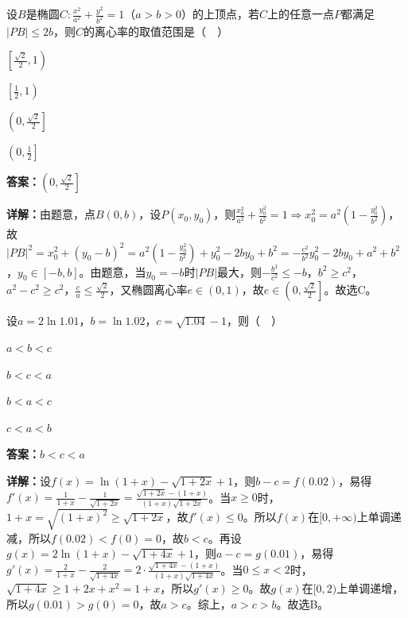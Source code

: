 \begin{question}[points=5]
设$B$是椭圆$C:\frac{x^2}{a^2}+\frac{y^2}{b^2}=1$（$a>b>0$）的上顶点，若$C$上的任意一点$P$都满足$|PB|\leq 2b$，则$C$的离心率的取值范围是（  ）
\begin{choices}
  \item $\left[\frac{\sqrt{2}}{2},1\right)$
  \item $\left[\frac12,1\right)$
  \item $\left(0,\frac{\sqrt{2}}{2}\right]$
  \item $\left(0,\frac12\right]$
\end{choices}
\begin{solution}
\textbf{答案：}$\left(0,\frac{\sqrt{2}}{2}\right]$

\textbf{详解：}由题意，点$B(0,b)$，设$P(x_0,y_0)$，则$\frac{x_0^2}{a^2}+\frac{y_0^2}{b^2}=1\Rightarrow x_0^2=a^2\left(1-\frac{y_0^2}{b^2}\right)$，故$|PB|^2=x_0^2+(y_0-b)^2=a^2\left(1-\frac{y_0^2}{b^2}\right)+y_0^2-2by_0+b^2=-\frac{c^2}{b^2}y_0^2-2by_0+a^2+b^2$，$y_0\in[-b,b]$。由题意，当$y_0=-b$时$|PB|$最大，则$-\frac{b^3}{c^2}\leq -b$，$b^2\geq c^2$，$a^2-c^2\geq c^2$，$\frac{c}{a}\leq\frac{\sqrt{2}}{2}$，又椭圆离心率$e\in(0,1)$，故$e\in\left(0,\frac{\sqrt{2}}{2}\right]$。故选C。
\end{solution}
\end{question}

\begin{question}[points=5]
设$a=2\ln1.01$，$b=\ln1.02$，$c=\sqrt{1.04}-1$，则（  ）
\begin{choices}
  \item $a<b<c$
  \item $b<c<a$
  \item $b<a<c$
  \item $c<a<b$
\end{choices}
\begin{solution}
\textbf{答案：}$b<c<a$

\textbf{详解：}设$f(x)=\ln(1+x)-\sqrt{1+2x}+1$，则$b-c=f(0.02)$，易得$f'(x)=\frac{1}{1+x}-\frac{1}{\sqrt{1+2x}}=\frac{\sqrt{1+2x}-(1+x)}{(1+x)\sqrt{1+2x}}$。当$x\geq0$时，$1+x=\sqrt{(1+x)^2}\geq\sqrt{1+2x}$，故$f'(x)\leq0$。所以$f(x)$在$[0,+\infty)$上单调递减，所以$f(0.02)<f(0)=0$，故$b<c$。再设$g(x)=2\ln(1+x)-\sqrt{1+4x}+1$，则$a-c=g(0.01)$，易得$g'(x)=\frac{2}{1+x}-\frac{2}{\sqrt{1+4x}}=2\cdot\frac{\sqrt{1+4x}-(1+x)}{(1+x)\sqrt{1+4x}}$。当$0\leq x<2$时，$\sqrt{1+4x}\geq 1+2x+x^2=1+x$，所以$g'(x)\geq0$。故$g(x)$在$[0,2)$上单调递增，所以$g(0.01)>g(0)=0$，故$a>c$。综上，$a>c>b$。故选B。
\end{solution}
\end{question}

